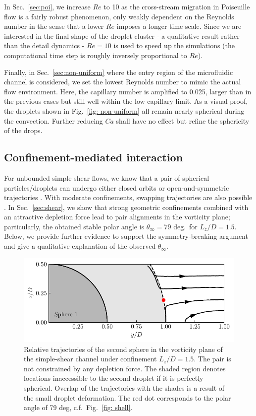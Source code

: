 In Sec.\ \ref{sec:poi}, we increase $Re$ to 10 as the cross-stream migration in Poiseuille flow is a fairly robust phenomenon, only weakly dependent on the Reynolds number in the sense that a lower $Re$ imposes a longer time scale. Since we are interested in the final shape of the droplet cluster - a qualitative result rather than the detail dynamics - $Re=10$ is used to speed up the simulations (the computational time step is roughly inversely proportional to $Re$).

Finally, in Sec.\ \ref{sec:non-uniform} where the entry region of the microfluidic channel is considered, we set the lowest Reynolds number to mimic the actual flow environment. Here, the capillary number is amplified to 0.025, larger than in the previous cases but still well within the low capillary limit. As a visual proof, the droplets shown in Fig.\ \ref{fig: non-uniform} all remain nearly spherical during the convection. Further reducing $Ca$ shall have no effect but refine the sphericity of the drops.


\subsection{Confinement-mediated interaction} \label{app:trajectory}

For unbounded simple shear flows, we know that a pair of spherical particles/droplets can undergo either closed orbits or open-and-symmetric trajectories \citep{batchelor_green_1972,Zinchenko1984}. With moderate confinements, swapping trajectories are also possible \citep{zurita-gotor_2007}. In Sec.\ \ref{sec:shear}, we show that strong geometric confinements combined with an attractive depletion force lead to pair alignments in the vorticity plane; particularly, the obtained stable polar angle is $\theta_\infty=79$ deg.\ for $L_z/D=1.5$. Below, we provide further evidence to support the symmetry-breaking argument and give a qualitative explanation of the observed $\theta_\infty$.

\begin{figure}[t]
 \centering
 \includegraphics[width=.85\columnwidth]{figs/traj.pdf}
 \caption{Relative trajectories of the second sphere in the vorticity plane of the simple-shear channel under confinement $L_z/D=1.5$. The pair is not constrained by any depletion force. The shaded region denotes locations inaccessible to the second droplet if it is perfectly spherical. Overlap of the trajectories with the shades is a result of the small droplet deformation. The red dot corresponds to the polar angle of 79 deg, c.f.\ Fig.\ \ref{fig: shell}.}
 \label{fig: traj}
\end{figure}


